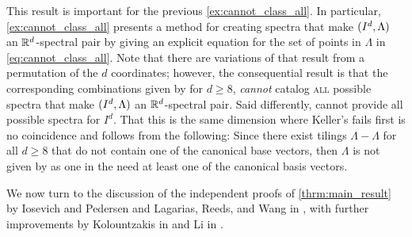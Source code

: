 \documentclass[../thesis.tex]{subfiles}
\begin{document}
This result is important for the previous \cref{ex:cannot_class_all}. In particular, \cref{ex:cannot_class_all} presents a method for creating spectra that make $(I^d,\Lambda)$ an $\mathbb{R}^d$-spectral pair by giving an explicit equation for the set of points in $\Lambda$ in \cref{eq:cannot_class_all}. Note that there are variations of  that result from a permutation of the $d$ coordinates; however, the consequential result is that the corresponding combinations given by  for $d\geq8$, \emph{cannot} catalog \textsc{all} possible spectra that make $(I^d,\Lambda)$ an $\mathbb{R}^d$-spectral pair. Said differently,  cannot provide all possible spectra for $I^d$. That this is the same dimension where Keller's  fails first is no coincidence and follows from the following: Since there exist tilings $\Lambda-\Lambda$ for all $d\geq8$ that do not contain one of the canonical base vectors, then $\Lambda$ is  not given by  as one in the  need at least one of the canonical basis vectors.


We now turn to the discussion of the independent proofs of \cref{thrm:main_result} by Iosevich and Pedersen \cite{iosevichSpectralTilingProperties1998} and Lagarias, Reeds, and Wang in \cite{lagariasOrthonormalBasesExponentials2000}, with further improvements by Kolountzakis in \cite{kolountzakisPackingTilingOrthogonality2000} and Li in \cite{liCharacterizationsSpectraTilings2004}. 
\end{document}
